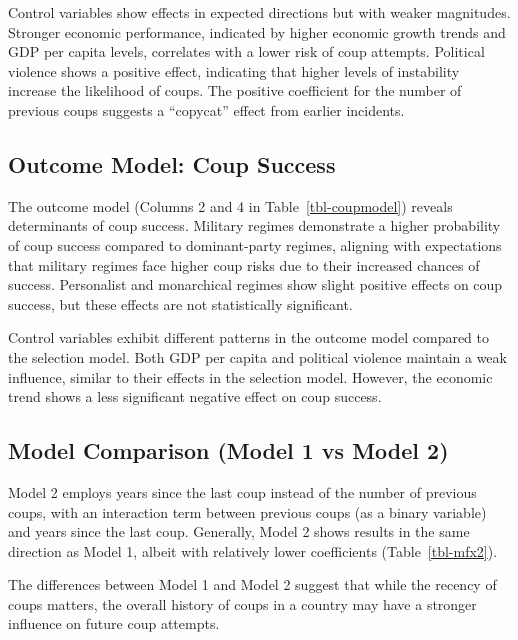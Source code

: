 \documentclass[
  12pt,
]{report}
\begin{document}
Control variables show effects in expected directions but with weaker
magnitudes. Stronger economic performance, indicated by higher economic
growth trends and GDP per capita levels, correlates with a lower risk of
coup attempts. Political violence shows a positive effect, indicating
that higher levels of instability increase the likelihood of coups. The
positive coefficient for the number of previous coups suggests a
``copycat'' effect from earlier incidents.

\subsection{Outcome Model: Coup
Success}\label{outcome-model-coup-success}

The outcome model (Columns 2 and 4 in Table~\ref{tbl-coupmodel}) reveals
determinants of coup success. Military regimes demonstrate a higher
probability of coup success compared to dominant-party regimes, aligning
with expectations that military regimes face higher coup risks due to
their increased chances of success. Personalist and monarchical regimes
show slight positive effects on coup success, but these effects are not
statistically significant.

Control variables exhibit different patterns in the outcome model
compared to the selection model. Both GDP per capita and political
violence maintain a weak influence, similar to their effects in the
selection model. However, the economic trend shows a less significant
negative effect on coup success.

\subsection{Model Comparison (Model 1 vs Model
2)}\label{model-comparison-model-1-vs-model-2}

Model 2 employs years since the last coup instead of the number of
previous coups, with an interaction term between previous coups (as a
binary variable) and years since the last coup. Generally, Model 2 shows
results in the same direction as Model 1, albeit with relatively lower
coefficients (Table~\ref{tbl-mfx2}).

The differences between Model 1 and Model 2 suggest that while the
recency of coups matters, the overall history of coups in a country may
have a stronger influence on future coup attempts.
\end{document}
